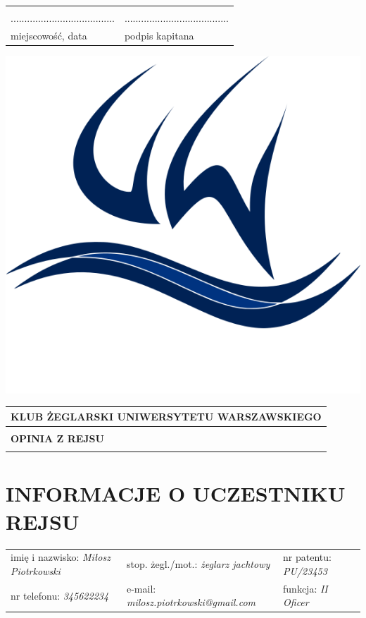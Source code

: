 \documentclass{article}
\begin{document}
\begin{tabularx}{\textwidth}{X X}
\\\\
...................................... & ......................................\\
miejscowość, data & podpis kapitana\\
\end{tabularx}
\newpage
\begin{minipage}{0.11\textwidth}
\includegraphics[width=\textwidth]{logo.png}
\end{minipage}
\begin{minipage}{0.89\textwidth}
\begin{tabularx}{\textwidth} { 
  | >{\centering\arraybackslash}X | }
 \hline
 \textbf{KLUB ŻEGLARSKI UNIWERSYTETU WARSZAWSKIEGO} \\
 \hline
 \\
 \textbf{\huge OPINIA Z REJSU} \\
 \\
\hline
\end{tabularx}
\end{minipage}

\section*{INFORMACJE O UCZESTNIKU REJSU}
\begin{tabularx}{\textwidth}{X X X}
imię i nazwisko: \textit{Miłosz Piotrkowski} & stop. żegl./mot.: \textit{żeglarz jachtowy} & nr patentu: \textit{PU/23453} \\
nr telefonu: \textit{345622234} & e-mail: \textit{milosz.piotrkowski@gmail.com} & funkcja: \textit{II Oficer} \\
\end{tabularx}
\end{document}
